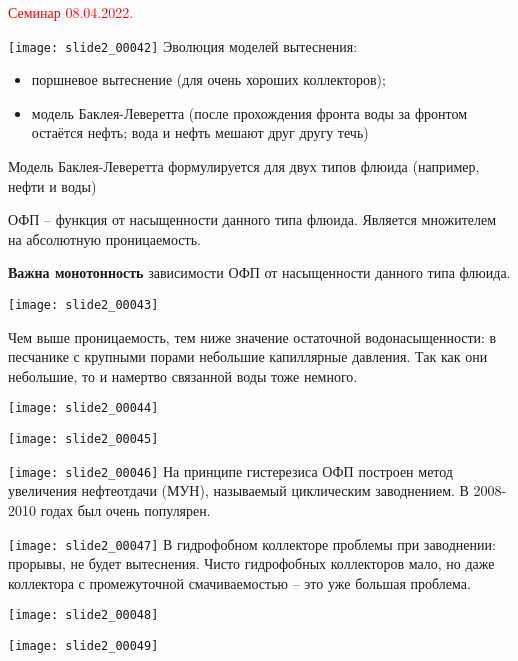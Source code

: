 \documentclass[main.tex]{subfiles}
\begin{document}
\textcolor{red}{Семинар 08.04.2022.}

\texttt{[image: slide2\_00042]}
Эволюция моделей вытеснения:
\begin{itemize}
	\item поршневое вытеснение (для очень хороших коллекторов);
	\item модель Баклея-Леверетта (после прохождения фронта воды за фронтом остаётся нефть; вода и нефть мешают друг другу течь)
\end{itemize}

Модель Баклея-Леверетта формулируется для двух типов флюида (например, нефти и воды)

ОФП -- функция от насыщенности данного типа флюида. Является множителем на абсолютную проницаемость.

\textbf{Важна монотонность} зависимости ОФП от насыщенности данного типа флюида.

\texttt{[image: slide2\_00043]}

Чем выше проницаемость, тем ниже значение остаточной водонасыщенности: в песчанике с крупными порами небольшие капиллярные давления. Так как они небольшие, то и намертво связанной воды тоже немного.



\texttt{[image: slide2\_00044]}

\texttt{[image: slide2\_00045]}

\texttt{[image: slide2\_00046]}
На принципе гистерезиса ОФП построен метод увеличения нефтеотдачи (МУН), называемый циклическим заводнением. В 2008-2010 годах был очень популярен.

\texttt{[image: slide2\_00047]}
В гидрофобном коллекторе проблемы при заводнении: прорывы, не будет вытеснения. Чисто гидрофобных коллекторов мало, но даже коллектора с промежуточной смачиваемостью -- это уже большая проблема.

\texttt{[image: slide2\_00048]}

\texttt{[image: slide2\_00049]}
\end{document}
